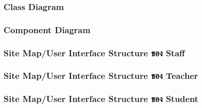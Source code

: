 \subsubsection{Class Diagram}

\subsubsection{Component Diagram}

\subsubsection{Site Map/User Interface Structure ของ Staff}

\subsubsection{Site Map/User Interface Structure ของ Teacher}

\subsubsection{Site Map/User Interface Structure ของ Student}
